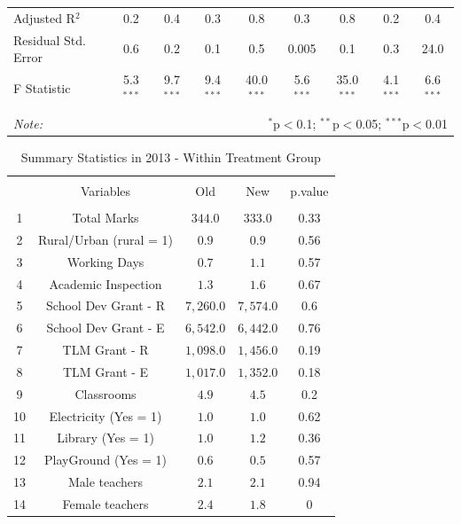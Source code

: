 \documentclass[12pt, a4paper]{article}
\begin{document}
\begin{landscape}
\begin{table}[!htbp]
{\begin{tabular}{@{\extracolsep{5pt}}lcccccccc}
			Adjusted R$^{2}$ & 0.2 & 0.4 & 0.3 & 0.8 & 0.3 & 0.8 & 0.2 & 0.4 \\ 
			Residual Std. Error & 0.6 & 0.2 & 0.1 & 0.5 & 0.005 & 0.1 & 0.3 & 24.0 \\ 
			F Statistic & 5.3$^{***}$ & 9.7$^{***}$ & 9.4$^{***}$ & 40.0$^{***}$ & 5.6$^{***}$ & 35.0$^{***}$ & 4.1$^{***}$ & 6.6$^{***}$ \\ 
			\hline 
			\hline \\[-1.8ex] 
			\textit{Note:}  & \multicolumn{8}{r}{$^{*}$p$<$0.1; $^{**}$p$<$0.05; $^{***}$p$<$0.01} \\ 
		\end{tabular} }
	\end{table} \end{landscape}

\begin{table}[!htbp] \centering 
	\caption{Summary Statistics in 2013 - Within Treatment Group} 
	\label{Table3} 
	\begin{tabular}{@{\extracolsep{5pt}} ccccc} 
		\\[-1.8ex]\hline 
		\hline \\[-1.8ex] 
		& Variables & Old & New & p.value \\ 
		\hline \\[-1.8ex] 
		1 & Total Marks & $344.0$ & $333.0$ & 0.33 \\ 
		2 & Rural/Urban (rural = 1) & $0.9$ & $0.9$ & 0.56 \\ 
		3 & Working Days & $0.7$ & $1.1$ & 0.57 \\ 
		4 & Academic Inspection & $1.3$ & $1.6$ & 0.67 \\ 
		5 & School Dev Grant - R & $7,260.0$ & $7,574.0$ & 0.6 \\ 
		6 & School Dev Grant - E & $6,542.0$ & $6,442.0$ & 0.76 \\ 
		7 & TLM Grant - R & $1,098.0$ & $1,456.0$ & 0.19 \\ 
		8 & TLM Grant - E & $1,017.0$ & $1,352.0$ & 0.18 \\ 
		9 & Classrooms & $4.9$ & $4.5$ & 0.2 \\ 
		10 & Electricity (Yes = 1) & $1.0$ & $1.0$ & 0.62 \\ 
		11 & Library  (Yes = 1) & $1.0$ & $1.2$ & 0.36 \\ 
		12 & PlayGround  (Yes = 1) & $0.6$ & $0.5$ & 0.57 \\ 
		13 & Male teachers & $2.1$ & $2.1$ & 0.94 \\ 
		14 & Female teachers & $2.4$ & $1.8$ & 0 \\ 

\end{tabular}
\end{table}
\end{document}
